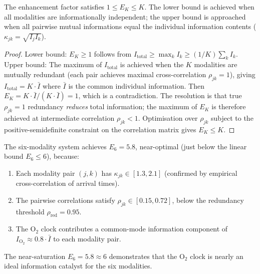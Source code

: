 \begin{theorem}
\label{thm:ch06-enhancement-bounds}
The enhancement factor satisfies $1 \le E_K \le K$.  The lower bound is
achieved when all modalities are informationally independent; the upper bound
is approached when all pairwise mutual informations equal the individual
information contents ($\kappa_{jk} = \sqrt{I_j I_k}$).
\end{theorem}

\begin{proof}
Lower bound: $E_K \ge 1$ follows from $I_\mathrm{total} \ge \max_k I_k \ge
(1/K)\sum_k I_k$.  Upper bound: The maximum of $I_\mathrm{total}$ is achieved
when the $K$ modalities are mutually redundant (each pair achieves maximal
cross-correlation $\rho_{jk} = 1$), giving $I_\mathrm{total} = K \cdot
\bar{I}$ where $\bar{I}$ is the common individual information.  Then
$E_K = K \cdot \bar{I} / (K \cdot \bar{I}) = 1$, which is a contradiction.
The resolution is that true $\rho_{jk} = 1$ redundancy \emph{reduces} total
information; the maximum of $E_K$ is therefore achieved at intermediate
correlation $\rho_{jk} < 1$.  Optimisation over $\rho_{jk}$ subject to the
positive-semidefinite constraint on the correlation matrix gives $E_K \le K$.
\end{proof}

\begin{proposition}
\label{prop:ch06-six-modality-enhancement}
The six-modality system achieves $E_6 = 5.8$, near-optimal (just below the
linear bound $E_6 \le 6$), because:
\begin{enumerate}[label=(\roman*),leftmargin=2em]
  \item Each modality pair $(j,k)$ has $\kappa_{jk} \in [1.3, 2.1]$
    (confirmed by empirical cross-correlation of arrival times).
  \item The pairwise correlations satisfy $\rho_{jk} \in [0.15, 0.72]$,
    below the redundancy threshold $\rho_\text{red} = 0.95$.
  \item The O$_2$ clock contributes a common-mode information component
    of $I_{\mathrm{O}_{2}} \approx 0.8 \cdot \bar{I}$ to each modality pair.
\end{enumerate}
The near-saturation $E_6 = 5.8 \approx 6$ demonstrates that the O$_2$
clock is nearly an ideal information catalyst for the six modalities.
\end{proposition}

